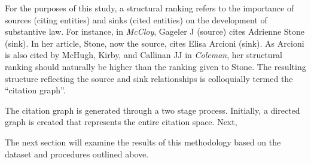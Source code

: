 For the purposes of this study, a structural ranking refers to the importance of sources (citing entities) and sinks (cited entities) on the development of substantive law. For instance, in \textit{McCloy},\xn{} Gageler J (source) cites Adrienne Stone (sink).\xn{} In her article, Stone, now the source, cites Elisa Arcioni (sink).\xn{} As Arcioni is also cited by McHugh, Kirby, and Callinan JJ in \textit{Coleman},\xn{} her structural ranking should naturally be higher than the ranking given to Stone. The resulting structure reflecting the source and sink relationships is colloquially termed the ``citation graph''.

The citation graph is generated through a two stage process. Initially, a directed graph is created that represents the entire citation space. Next, 


The next section will examine the results of this methodology based on the dataset and procedures outlined above.



